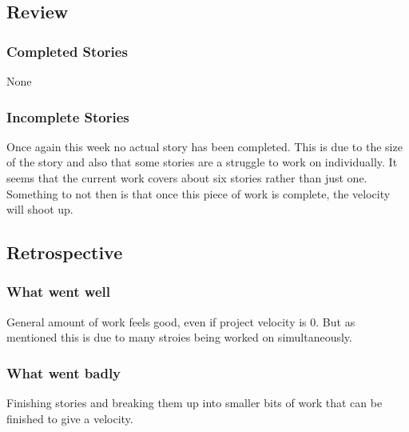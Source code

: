 \subsection{Review}
\subsubsection{Completed Stories}
None
\subsubsection{Incomplete Stories}
Once again this week no actual story has been completed. This is due to the size of the story and also that some stories are a struggle to work on individually. It seems that the current work covers about six stories rather than just one. Something to not then is that once this piece of work is complete, the velocity will shoot up.

\subsection{Retrospective}
\subsubsection{What went well}
General amount of work feels good, even if project velocity is 0. But as mentioned this is due to many stroies being worked on simultaneously.
\subsubsection{What went badly}
Finishing stories and breaking them up into smaller bits of work that can be finished to give a velocity.
\newpage
